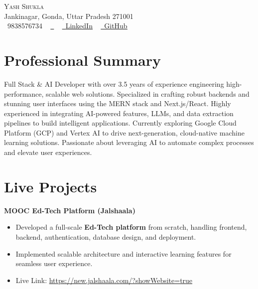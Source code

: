 \documentclass[letterpaper,11pt]{article}
\newcommand{\resumeItem}[1]{
  \item\small{
    {#1 \vspace{-2pt}}
  }
}
\newcommand{\resumeItemListStart}{\begin{itemize}}
\newcommand{\resumeItemListEnd}{\end{itemize}\vspace{-5pt}}
\begin{document}
\begin{center}
    {\Huge \scshape Yash Shukla} \\ \vspace{1pt}
    Jankinagar, Gonda, Uttar Pradesh 271001\\ \vspace{1pt}
    \small \raisebox{-0.1\height}\faPhone\ 9838576734 ~
   \href{mailto:shuklayash457@gmail.com}{\raisebox{-0.2\height}\faEnvelope\ }
  ~ 
    \href{https://www.linkedin.com/in/yash-shukla-b92553212/}{\raisebox{-0.2\height}\faLinkedin\ \underline{LinkedIn}}  ~
    \href{https://github.com/yashshuklaaa}{\raisebox{-0.2\height}\faGithub\ \underline{GitHub}}
    \vspace{-8pt}
\end{center}

\section{Professional Summary}
\small{Full Stack \& AI Developer with over 3.5 years of experience engineering high-performance, scalable web solutions. Specialized in crafting robust backends and stunning user interfaces using the MERN stack and Next.js/React. Highly experienced in integrating AI-powered features, LLMs, and data extraction pipelines to build intelligent applications. Currently exploring Google Cloud Platform (GCP) and Vertex AI to drive next-generation, cloud-native machine learning solutions. Passionate about leveraging AI to automate complex processes and elevate user experiences.}
\vspace{2pt}

\section{Live Projects}
\vspace{4pt}

\textbf{MOOC Ed-Tech Platform (Jalshaala)} \\
\vspace{2pt}
\resumeItemListStart
\resumeItem{Developed a full-scale \textbf{Ed-Tech platform} from scratch, handling frontend, backend, authentication, database design, and deployment.}
\resumeItem{Implemented scalable architecture and interactive learning features for seamless user experience.}
\resumeItem{Live Link: \href{https://new.jalshaala.com/?showWebsite=true}{https://new.jalshaala.com/?showWebsite=true}}
\resumeItemListEnd
\end{document}
